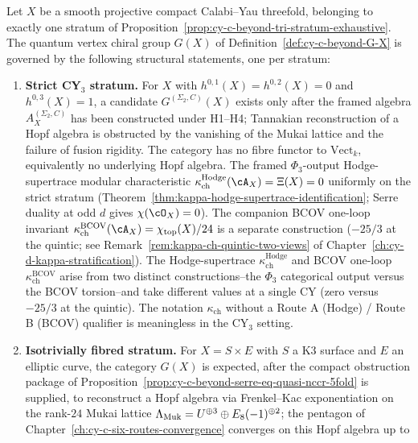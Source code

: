 \begin{conjecture}
\label{thm:cy-c-beyond-k3e-existence}
\ClaimStatusConjectured
Let $X$ be a smooth projective compact Calabi--Yau threefold, belonging to exactly one
stratum of Proposition~\ref{prop:cy-c-beyond-tri-stratum-exhaustive}. The quantum vertex
chiral group $G(X)$ of Definition~\ref{def:cy-c-beyond-G-X} is governed by the following
structural statements, one per stratum:
\begin{enumerate}[label=\textup{(\roman*)}]
 \item \textbf{Strict CY$_3$ stratum.} For $X$ with $h^{0,1}(X) = h^{0,2}(X) = 0$
 and $h^{0,3}(X) = 1$, a candidate $G^{(\Sigma_2,C)}(X)$ exists only after
 the framed algebra $A_X^{(\Sigma_2,C)}$ has been constructed under H1--H4;
 Tannakian reconstruction of a
 Hopf algebra is obstructed by the vanishing of the Mukai lattice and the failure
 of fusion rigidity. The category has no fibre functor to $\mathrm{Vect}_k$,
 equivalently no underlying Hopf algebra. The framed $\Phi_3$-output Hodge-supertrace
 modular characteristic
 $\kappa_{\mathrm{ch}}^{\mathrm{Hodge}}(\cA_X) = \Xi(X) = 0$ uniformly on the strict
 stratum (Theorem~\ref{thm:kappa-hodge-supertrace-identification}; Serre duality
 at odd $d$ gives $\chi(\cO_X) = 0$). The companion BCOV one-loop invariant
 $\kappa_{\mathrm{ch}}^{\mathrm{BCOV}}(\cA_X) = \chi_{\mathrm{top}}(X)/24$
 is a separate construction ($-25/3$ at the quintic; see
 Remark~\ref{rem:kappa-ch-quintic-two-views} of
 Chapter~\ref{ch:cy-d-kappa-stratification}). The Hodge-supertrace
 $\kappa_{\mathrm{ch}}^{\mathrm{Hodge}}$ and BCOV one-loop
 $\kappa_{\mathrm{ch}}^{\mathrm{BCOV}}$ arise from two distinct
 constructions--the $\Phi_3$ categorical output versus the
 BCOV torsion--and take different values at a single CY (zero
 versus $-25/3$ at the quintic). The notation $\kappa_{\mathrm{ch}}$
 without a Route A (Hodge) / Route B (BCOV) qualifier is
 meaningless in the CY$_3$ setting.
 \item \textbf{Isotrivially fibred stratum.} For $X = S \times E$ with $S$ a K3 surface
 and $E$ an elliptic curve, the category $G(X)$ is expected, after the
 compact obstruction package of
 Proposition~\ref{prop:cy-c-beyond-serre-eq-quasi-nccr-5fold} is
 supplied, to reconstruct a Hopf algebra via Frenkel--Kac exponentiation
 on the rank-$24$ Mukai lattice
 $\Lambda_{\mathrm{Muk}} = U^{\oplus 3} \oplus E_8(-1)^{\oplus 2}$; the pentagon of
 Chapter~\ref{ch:cy-c-six-routes-convergence} converges on this Hopf algebra up to

\end{enumerate}
\end{conjecture}

